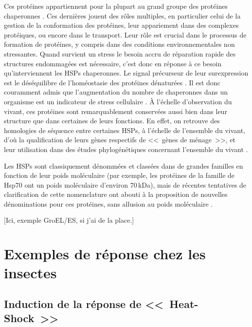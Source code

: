 	Ces protéines appartiennent pour la plupart au grand groupe des protéines chaperonnes \cite{federhoffmann1999}.
	Ces dernières jouent des rôles multiples, en particulier celui de la gestion de la conformation des protéines, leur appariement dans des complexes protéiques, ou encore dans le transport.
	Leur rôle est crucial dans le processus de formation de protéines, y compris dans des conditions environnementales non stressantes.
	Quand survient un stress le besoin accru de réparation rapide des structures endommagées est nécessaire, c'est donc en réponse à ce besoin qu'interviennent les HSPs chaperonnes.
	Le signal précurseur de leur surexpression est le déséquilibre de l'homéostasie des protéines dénaturées \cite{ananthan1986}.
	Il est donc couramment admis que l'augmentation du nombre de chaperonnes dans un organisme est un indicateur de stress cellulaire \cite{ryan1996}.
	À l'échelle d'observation du vivant, ces protéines sont remarquablement conservées aussi bien dans leur structure que dans certaines de leurs fonctions.
	En effet, on retrouve des homologies de séquence entre certaines HSPs, à l'échelle de l'ensemble du vivant, d'où la qualification de leurs gènes respectifs de <<~gènes de ménage~>>, et leur utilisation dans des études phylogénétiques concernant l'ensemble du vivant \cite{gupta1995}.

	Les HSPs sont classiquement dénommées et classées dans de grandes familles en fonction de leur poids moléculaire (par exemple, les protéines de la famille de Hsp70 ont un poids moléculaire d'environ 70\,kDa), mais de récentes tentatives de clarification de cette nomenclature ont abouti à la proposition de nouvelles dénominations pour ces protéines, sans allusion au poids moléculaire \cite{kampinga2009}.

	[Ici, exemple GroEL/ES, si j'ai de la place.]

	\section{Exemples de réponse chez les insectes}

		\subsection{Induction de la réponse de <<~Heat-Shock~>>}
